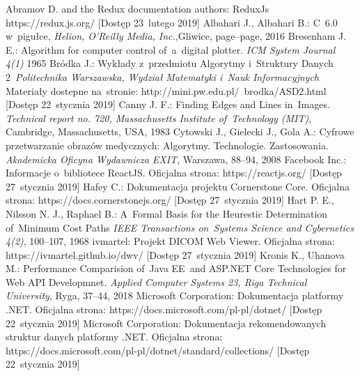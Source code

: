 \documentclass[a4paper,11pt,twoside,openright]{report}
\theoremstyle{definition}
\begin{document}
\begin{thebibliography}{24}%
{}


 Abramov D. and the Redux documentation authors: ReduxJs https://redux.js.org/ [Dostęp 23~lutego 2019]
 Albahari J., Albahari B.: C~6.0 w~pigułce, \emph{Helion, O'Reilly Media, Inc.},Gliwice, page--page, 2016
 Bresenham J. E.: Algorithm for computer control of~a~digital plotter. \emph{ICM System Journal 4(1)} 1965
 Bródka J.: Wykłady z~przedmiotu Algorytmy i~Struktury Danych 2~\emph{Politechnika Warszawska, Wydział Matematyki i~Nauk Informacyjnych} Materiały dostepne na~stronie: http://mini.pw.edu.pl/~brodka/ASD2.html [Dostęp 22~stycznia 2019]
 Canny J. F.: Finding Edges and Lines in~Images. \emph{Technical report no. 720, Massachusetts Institute of~Technology (MIT)}, Cambridge, Massachusetts, USA, 1983
 Cytowski J., Gielecki J., Gola A.: Cyfrowe przetwarzanie obrazów medycznych: Algorytmy. Technologie. Zastosowania. \emph{Akademicka Oficyna Wydawnicza EXIT}, Warszawa, 88--94, 2008
 Facebook Inc.: Informacje o~bibliotece ReactJS. Oficjalna strona: https://reactjs.org/ [Dostęp 27~stycznia 2019]
  Hafey C.: Dokumentacja projektu Cornerstone Core. Oficjalna strona: https://docs.cornerstonejs.org/ [Dostęp 27~stycznia 2019]
 Hart P. E., Nilsson N. J., Raphael B.: A~Formal Basis for the Heurestic Determination of~Minimum Cost Paths \emph{IEEE Transactions on~Systems Science and Cybernetics 4(2)}, 100--107, 1968
  ivmartel: Projekt DICOM Web Viewer. Oficjalna strona: https://ivmartel.github.io/dwv/ [Dostęp 27~stycznia 2019]
 Kronis K., Uhanova M.: Performance Comparision of~Java EE~and ASP.NET Core Technologies for Web API Developmnet. \emph{Applied Computer Systems 23, Riga Technical University}, Ryga, 37--44, 2018
 Microsoft Corporation: Dokumentacja platformy .NET. Oficjalna strona: https://docs.microsoft.com/pl-pl/dotnet/ [Dostęp 22~stycznia 2019]
 Microsoft Corporation: Dokumentacja rekomendowanych struktur danych platformy .NET. Oficjalna strona: https://docs.microsoft.com/pl-pl/dotnet/standard/collections/ [Dostęp 22~stycznia 2019]

\end{thebibliography}
\end{document}
